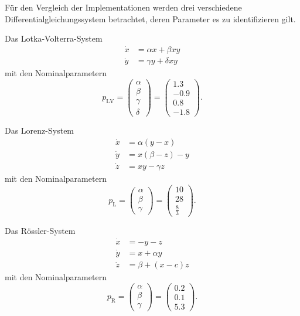 Für den Vergleich der Implementationen werden drei verschiedene Differentialgleichungssystem betrachtet, deren Parameter es zu identifizieren gilt.

Das Lotka-Volterra-System
\begin{equation}
\begin{aligned}
\dot{x} &= \alpha x +\beta xy\\
\dot{y} &= \gamma y + \delta xy 
\end{aligned}
\end{equation}
mit den Nominalparametern
\begin{equation}
p_\text{LV}=\left(\begin{array}{c}
		\alpha\\\beta\\\gamma\\\delta
\end{array}\right) 
= \left(\begin{array}{c}
		1.3\\ -0.9\\ 0.8\\ -1.8
\end{array}\right).
\end{equation}

Das Lorenz-System
\begin{equation}
\begin{aligned}
\dot{x} &= \alpha(y-x)\\
\dot{y} &= x(\beta - z) -y\\
\dot{z} &= xy-\gamma z
\end{aligned}
\end{equation}
mit den Nominalparametern
\begin{equation}
p_\text{L}=\left(\begin{array}{c}
		\alpha\\\beta\\\gamma
\end{array}\right) 
= \left(\begin{array}{c}
		10\\ 28\\ \frac{8}{3}
\end{array}\right).
\end{equation}

Das Rössler-System
\begin{equation}
\begin{aligned}
\dot{x} &= -y-z\\
\dot{y} &= x+\alpha y\\
\dot{z} &= \beta + (x-c)z
\end{aligned}
\end{equation}
mit den Nominalparametern
\begin{equation}
p_\text{R}=\left(\begin{array}{c}
		\alpha\\\beta\\\gamma
\end{array}\right) 
= \left(\begin{array}{c}
		0.2\\ 0.1\\ 5.3
\end{array}\right).
\end{equation}

